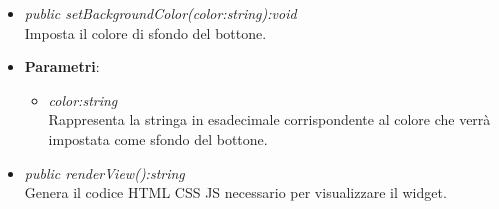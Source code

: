 \begin{itemize}
\begin{itemize}
{\begin{itemize}
		\end{itemize}}
	\item \textit{public setBackgroundColor(color:string):void}\\
	Imposta il colore di sfondo del bottone.
		\item{\textbf{Parametri}: \begin{itemize}
		\item \textit{color:string}\\
		Rappresenta la stringa in esadecimale corrispondente al colore che verrà impostata come sfondo del bottone.
		\end{itemize}}
	\item \textit{public renderView():string}\\
	Genera il codice HTML CSS JS necessario per visualizzare il widget.
	\end{itemize}
\end{itemize}

